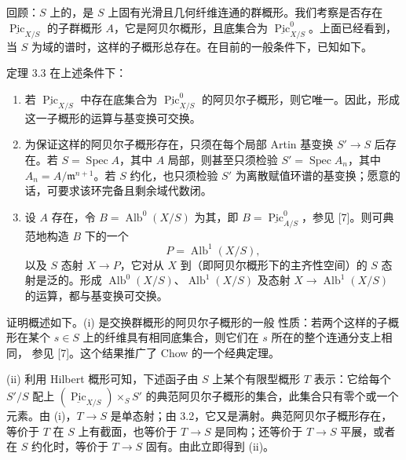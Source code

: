回顾：$S$ 上的，是 $S$ 上固有光滑且几何纤维连通的群概形。我们考察是否存在 $\underline{\operatorname{Pic}}_{X/S}$ 的子群概形 $A$，它是阿贝尔概形，且底集合为 $\underline{\operatorname{Pic}}^0_{X/S}$。上面已经看到，当 $S$ 为域的谱时，这样的子概形总存在。在目前的一般条件下，已知如下。

\begin{statement}{定理 3.3}
在上述条件下：
\begin{enumerate}
\item[(i)] 若 $\underline{\operatorname{Pic}}_{X/S}$ 中存在底集合为 $\underline{\operatorname{Pic}}^0_{X/S}$ 的阿贝尔子概形，则它唯一。因此，形成这一子概形的运算与基变换可交换。
\item[(ii)] 为保证这样的阿贝尔子概形存在，只须在每个局部 Artin 基变换 $S'\to S$ 后存在。若 $S=\operatorname{Spec}A$，其中 $A$ 局部，则甚至只须检验 $S'=\operatorname{Spec}A_n$，其中 $A_n=A/\mathfrak m^{n+1}$。若 $S$ 约化，也只须检验 $S'$ 为离散赋值环谱的基变换；愿意的话，可要求该环完备且剩余域代数闭。
\item[(iii)] 设 $A$ 存在，令 $B=\operatorname{Alb}^0(X/S)$ 为其，即 $B=\underline{\operatorname{Pic}}^0_{A/S}$，参见 [7]。则可典范地构造 $B$ 下的一个
\[
 P=\operatorname{Alb}^1(X/S),
\]
以及 $S$ 态射 $X\to P$，它对从 $X$ 到（即阿贝尔概形下的主齐性空间）的 $S$ 态射是泛的。形成 $\operatorname{Alb}^0(X/S)$、$\operatorname{Alb}^1(X/S)$ 及态射 $X\to\operatorname{Alb}^1(X/S)$ 的运算，都与基变换可交换。
\end{enumerate}
\end{statement}

证明概述如下。(i) 是交换群概形的阿贝尔子概形的一般 性质：若两个这样的子概形在某个 $s\in S$ 上的纤维具有相同底集合，则它们在 $s$ 所在的整个连通分支上相同，
参见 [7]。这个结果推广了 Chow 的一个经典定理。

(ii) 利用 Hilbert 概形可知，下述函子由 $S$ 上某个有限型概形 $T$ 表示：它给每个 $S'/S$ 配上 $(\underline{\operatorname{Pic}}_{X/S})\times_SS'$ 的典范阿贝尔子概形的集合，此集合只有零个或一个元素。由 (i)，$T\to S$ 是单态射；由 3.2，它又是满射。典范阿贝尔子概形存在，等价于 $T$ 在 $S$ 上有截面，也等价于 $T\to S$ 是同构；还等价于 $T\to S$ 平展，或者在 $S$ 约化时，等价于 $T\to S$ 固有。由此立即得到 (ii)。

